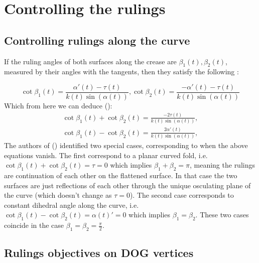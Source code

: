 \section{Controlling the rulings} \label{sec:rulings}

\subsection{Controlling rulings along the curve} 
If the ruling angles of both surfaces along the crease are $\beta_1(t),\beta_2(t)$, measured by their angles with the tangents, then they satisfy the following \cite{more_on_paper,duncan_folded}:

\begin{equation}
\cot\beta_1(t) = \frac{\alpha'(t)-\tau(t)}{k(t)\sin(\alpha(t))},\cot\beta_2(t) = \frac{-\alpha'(t)-\tau(t)}{k(t)\sin(\alpha(t))}
\end{equation}
Which from here we can deduce (\cite{mathematical_omnibus,duncan_folded}):
\begin{equation} \label{cot_eq}
\begin{split}
\cot\beta_1(t) + \cot\beta_2(t) = \frac{-2\tau(t)}{k(t)\sin(\alpha(t))},\\
\cot\beta_1(t) - \cot\beta_2(t) = \frac{2\alpha'(t)}{k(t)\sin(\alpha(t))},
\end{split}	
\end{equation}
The authors of (\cite{mathematical_omnibus,duncan_folded}) identified two special cases, corresponding to when the above equations vanish. The first correspond to a planar curved fold, i.e. $\cot\beta_1(t) + \cot\beta_2(t) = \tau = 0$ which implies $\beta_1+\beta_2 = \pi$, meaning the rulings are continuation of each other on the flattened surface. In that case the two surfaces are just reflections of each other through the unique osculating plane of the curve (which doesn't change as $\tau = 0$). The second case corresponds to constant dihedral angle along the curve, i.e. $\cot\beta_1(t) - \cot\beta_2(t) = \alpha(t)' = 0$ which implies $\beta_1 = \beta_2$. These two cases coincide in the case $\beta_1 = \beta_2 = \frac{\pi}{2}$.


\subsection{Rulings objectives on DOG vertices}
